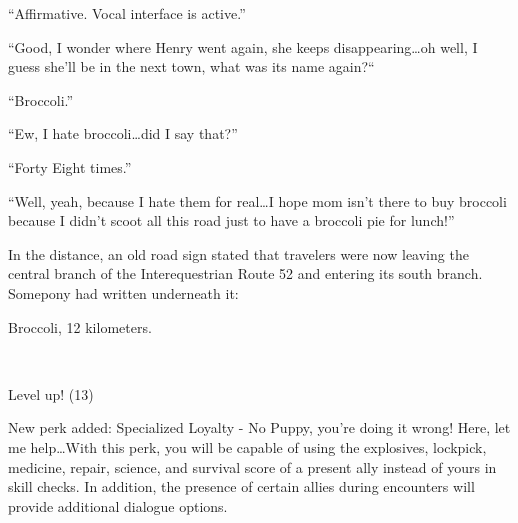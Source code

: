 ``{\mt Affirmative. Vocal interface is active.}''

``Good, I wonder where Henry went again, she keeps disappearing\dots oh well, I guess she'll be in the next town, what was its name again?{}``

``{\mt Broccoli.}''

``Ew, I hate broccoli\dots did I say that?''

``{\mt Forty Eight times.}''

``Well, yeah, because I hate them for real\dots I hope mom isn't there to buy broccoli because I didn't scoot all this road just to have a broccoli pie for lunch!''

In the distance, an old road sign stated that travelers were now leaving the central branch of the Interequestrian Route 52 and entering its south branch. Somepony had written underneath it: 

\begin{center}
    Broccoli, 12 kilometers.
\end{center}

~\vfill

\begin{engnote}
    Level up! (13)
    
    New perk added: Specialized Loyalty - No Puppy, you're doing it wrong! Here, let me help\dots With this perk, you will be capable of using the explosives, lockpick, medicine, repair, science, and survival score of a present ally instead of yours in skill checks. In addition, the presence of certain allies during encounters will provide additional dialogue options.
\end{engnote}
